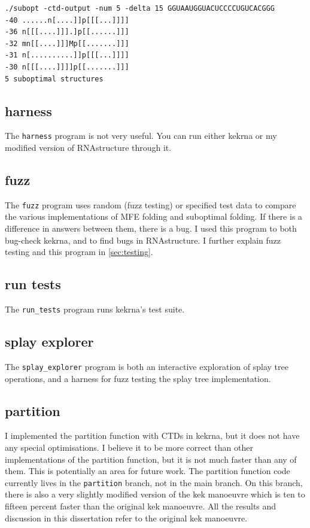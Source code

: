 \documentclass{cshonours}
\begin{document}
\begin{lstlisting}[caption={Suboptimal folding example},label={lst:subopt}]
./subopt -ctd-output -num 5 -delta 15 GGUAAUGGUACUCCCCUGUCACGGG
-40 ......n[....]]p[[[...]]]]
-36 n[[[....]]].]p[[......]]]
-32 mn[[....]]]Mp[[.......]]]
-31 n[..........]]p[[[...]]]]
-30 n[[[....]]]]p[[.......]]]
5 suboptimal structures
\end{lstlisting}

\subsection{harness}
The \texttt{harness} program is not very useful. You can run either kekrna or my modified version of RNAstructure through it.

\subsection{fuzz}
The \texttt{fuzz} program uses random (fuzz testing) or specified test data to compare the various implementations of MFE folding and suboptimal folding. If there is a difference in answers between them, there is a bug. I used this program to both bug-check kekrna, and to find bugs in RNAstructure. I further explain fuzz testing and this program in \autoref{sec:testing}.
\subsection{run tests}
The \texttt{run\_tests} program runs kekrna's test suite.
\subsection{splay explorer}
The \texttt{splay\_explorer} program is both an interactive exploration of splay tree operations, and a harness for fuzz testing the splay tree implementation.
\subsection{partition}
I implemented the partition function with CTDs in kekrna, but it does not have any special optimisations. I believe it to be more correct than other implementations of the partition function, but it is not much faster than any of them. This is potentially an area for future work. The partition function code currently lives in the \texttt{partition} branch, not in the main branch. On this branch, there is also a very slightly modified version of the kek manoeuvre which is ten to fifteen percent faster than the original kek manoeuvre. All the results and discussion in this dissertation refer to the original kek manoeuvre.
\end{document}
